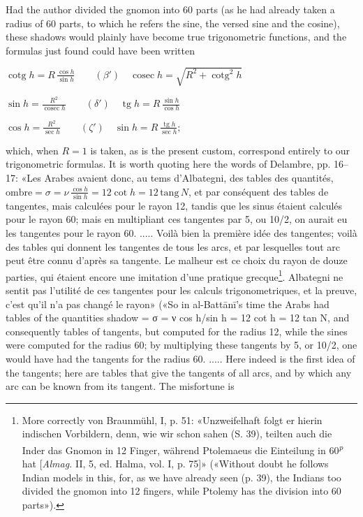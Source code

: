 \documentclass[11pt]{article}
\newcommand{\Pg}[1]{\marginpar{\footnotesize\color{gray}#1}}
\begin{document}
\par \Pg{I 182}Had the author divided the gnomon into 60 parts (as he had already taken a radius of 60 parts, to which he refers the sine, the versed sine and the cosine), these shadows would plainly have become true trigonometric functions, and the formulas just found could have been written \par\noindent\hspace*{1.5em}$\displaystyle \operatorname{cotg} h = R\,\frac{\cos h}{\sin h} \qquad (\beta')\quad \operatorname{cosec} h = \sqrt{R^2 + \operatorname{cotg}^2 h}$\par \par\noindent\hspace*{1.5em}$\displaystyle \sin h = \frac{R^2}{\operatorname{cosec} h} \qquad (\delta')\quad \operatorname{tg} h = R\,\frac{\sin h}{\cos h}$\par \par\noindent\hspace*{1.5em}$\displaystyle \cos h = \frac{R^2}{\sec h} \qquad (\zeta')\quad \sin h = R\,\frac{\operatorname{tg} h}{\sec h};$\par which, when $R = 1$ is taken, as is the present custom, correspond entirely to our trigonometric formulas. It is worth quoting here the words of Delambre, pp. 16–17: «Les Arabes avaient donc, au tems d’Albategni, des tables des quantités, $\text{ombre} = \sigma = \nu\,\frac{\cos h}{\sin h} = 12 \cot h = 12\,\text{tang}\,N$, et par conséquent des tables de tangentes, mais calculées pour le rayon 12, tandis que les sinus étaient calculés pour le rayon 60; mais en multipliant ces tangentes par 5, ou 10/2, on aurait eu les tangentes pour le rayon 60. ..... Voilà bien la première idée des tangentes; voilà des tables qui donnent les tangentes de tous les arcs, et par lesquelles tout arc peut être connu d’après sa tangente. Le malheur est ce choix du rayon de douze parties, qui étaient encore une imitation d’une pratique grecque\footnote{More correctly von Braunmühl, I, p. 51: «Unzweifelhaft folgt er hierin indischen Vorbildern, denn, wie wir schon sahen (S. 39), teilten auch die Inder das Gnomon in 12 Finger, während Ptolemaeus die Einteilung in 60\textsuperscript{\itshape p} hat [\emph{Almag.} II, 5, ed. Halma, vol. I, p. 75]» («Without doubt he follows Indian models in this, for, as we have already seen (p. 39), the Indians too divided the gnomon into 12 fingers, while Ptolemy has the division into 60 parts»).}. Albategni ne sentit pas l’utilité de ces tangentes pour les calculs trigonometriques, et la preuve, c’est qu’il n’a pas changé le rayon» («So in al-Battānī's time the Arabs had tables of the quantities shadow = {\greekfont σ} = {\greekfont ν} cos h/sin h = 12 cot h = 12 tan N, and consequently tables of tangents, but computed for the radius 12, while the sines were computed for the radius 60; by multiplying these tangents by 5, or 10/2, one would have had the tangents for the radius 60. ..... Here indeed is the first idea of the tangents; here are tables that give the tangents of all arcs, and by which any arc can be known from its tangent. The misfortune is 
\end{document}
